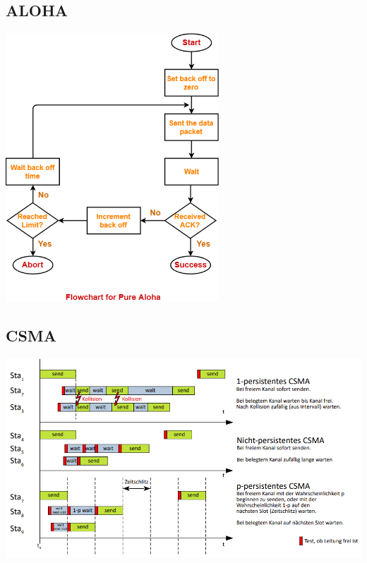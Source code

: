 \documentclass[12pt,a4paper]{article}
\begin{document}
		\subsection{ALOHA}
			\begin{center}
				\includegraphics[width=0.6\textwidth]{Bilder/aloha.png}
			\end{center}

		\subsection{CSMA}
			\begin{center}
				\includegraphics[width=\textwidth]{Bilder/csma.PNG}
			\end{center}
\end{document}
